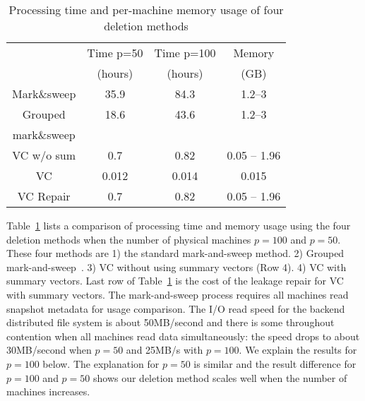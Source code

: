 

\begin{table}[htb]
\centering
\begin{tabular}{|c|c|c|c|}
    \hline 
	    &Time p=50 & Time p=100 & Memory \\
	    &(hours)  & (hours) & (GB) \\
\hline
Mark\&sweep  & 35.9  &  84.3  & 1.2--3 \\
\hline
Grouped &     18.6    & 43.6   & 1.2--3 \\
mark\&sweep &        &    &  \\
\hline
VC w/o sum &  0.7     & 0.82   & 0.05 -- 1.96 \\
\hline
VC  &  0.012      & 0.014   & 0.015  \\
\hline
\hline
VC Repair  &  0.7      & 0.82   & 0.05 -- 1.96 \\
\hline
    \end{tabular}
    \caption{ Processing time and per-machine memory usage  of
four deletion methods}  
    \label{tab:deletion-cmp}
\end{table}

Table~\ref{tab:deletion-cmp}   lists a comparison of processing time and memory usage
using the four deletion methods when the number of physical machines
$p=100$ and $p=50$. These four 
methods are 1) the standard mark-and-sweep method. 2) Grouped mark-and-sweep~\cite{Guo2011}. 
3)   VC without using summary vectors (Row 4). 4) VC with summary vectors.
Last row of Table~\ref{tab:deletion-cmp} 
is the cost of the leakage  repair for VC with summary vectors.
The mark-and-sweep process requires all machines read snapshot metadata for usage comparison.
The I/O read speed for the backend distributed file system is about 50MB/second
and there is some throughout contention when all machines read data simultaneously:
the speed drops to about 30MB/second when $p=50$ and 25MB/s with $p=100$.
We explain the results for $p=100$ below.
The explanation for $p=50$ is similar and the result difference for $p=100$ and $p=50$ shows
our deletion method scales well when the number of machines increases.


